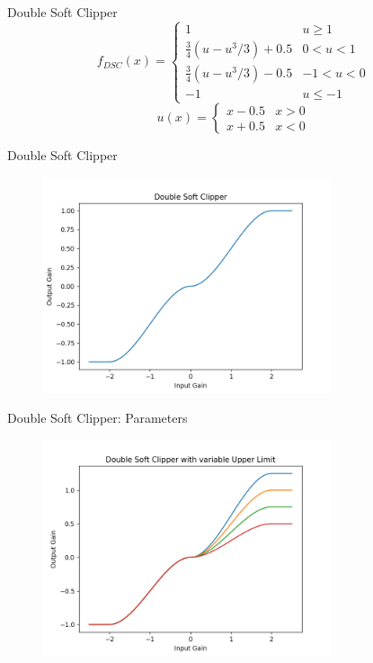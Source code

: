 \begin{frame}{Double Soft Clipper}
    \begin{equation}
        f_{DSC}(x) = \begin{cases} 1 & u \geq 1 \\ \frac{3}{4} (u - u^3/3) + 0.5 & 0 < u < 1 \\ \frac{3}{4} (u - u^3/3) - 0.5 & -1 < u < 0 \\ -1 & u \leq -1 \end{cases}
    \end{equation}
    \vspace{2ex}
    \begin{equation}
        u(x) = \begin{cases} x - 0.5 & x > 0 \\ x + 0.5 & x < 0 \end{cases}
    \end{equation}
\end{frame}

\begin{frame}{Double Soft Clipper}
    \begin{figure}
        \centering
        \includegraphics[height=2.5in]{../DoubleSoftClipper/Pics/Double.png}
    \end{figure}
\end{frame}

\begin{frame}{Double Soft Clipper: Parameters}
    \begin{figure}
        \centering
        \includegraphics[height=2.5in]{../DoubleSoftClipper/Pics/VarUpperLim.png}
    \end{figure}
\end{frame}

